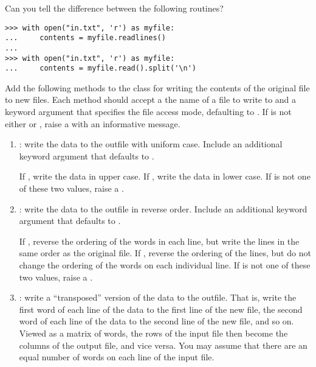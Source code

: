 Can you tell the difference between the following routines?

\begin{lstlisting}
>>> with open("in.txt", 'r') as myfile:
...     contents = myfile.readlines()
...
>>> with open("in.txt", 'r') as myfile:
...     contents = myfile.read().split('\n')
\end{lstlisting}

\begin{problem} %
Add the following methods to the  class for writing the contents of the original file to new files.
Each method should accept a the name of a file to write to and a keyword argument  that specifies the file access mode, defaulting to .
If  is not either  or , raise a  with an informative message.

\begin{enumerate}
\item {}: write the data to the outfile with uniform case. Include an additional keyword argument  that defaults to .

If , write the data in upper case.
If , write the data in lower case.
If  is not one of these two values, raise a .

\item {}: write the data to the outfile in reverse order. Include an additional keyword argument  that defaults to .

If , reverse the ordering of the words in each line, but write the lines in the same order as the original file.
If , reverse the ordering of the lines, but do not change the ordering of the words on each individual line.
If  is not one of these two values, raise a .

\item {}: write a ``transposed'' version of the data to the outfile.
That is, write the first word of each line of the data to the first line of the new file, the second word of each line of the data to the second line of the new file, and so on.
Viewed as a matrix of words, the rows of the input file then become the columns of the output file, and vice versa.
You may assume that there are an equal number of words on each line of the input file.
\end{enumerate}


\end{problem}
